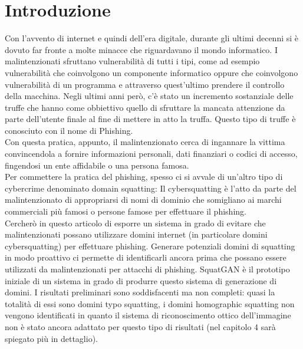 \chapter{Introduzione}

Con l'avvento di internet e quindi dell'era digitale, durante gli ultimi decenni si è dovuto far fronte a molte minacce che riguardavano il mondo informatico. I malintenzionati sfruttano vulnerabilità di tutti i tipi, come ad esempio vulnerabilità che coinvolgono un componente informatico oppure che coinvolgono vulnerabilità di un programma e attraverso quest'ultimo prendere il controllo della macchina.
Negli ultimi anni però, c'è stato un incremento sostanziale delle truffe che hanno come obbiettivo quello di sfruttare la mancata attenzione da parte dell'utente finale al fine di mettere in atto la truffa.
Questo tipo di truffe è conosciuto con il nome di Phishing.\\
Con questa pratica, appunto, il malintenzionato cerca di ingannare la vittima convincendola a fornire informazioni personali, dati finanziari o codici di accesso, fingendosi un ente affidabile o una persona famosa.\\
Per commettere la pratica del phishing, spesso ci si avvale di un'altro tipo di cybercrime denominato domain squatting: Il cybersquatting è l'atto da parte del malintenzionato di appropriarsi di nomi di dominio che somigliano ai marchi commerciali più famosi o persone famose per effettuare il phishing.\\
Cercherò in questo articolo di esporre un sistema in grado di evitare che malintenzionati possano utilizzare domini internet (in particolare domini cybersquatting) per effettuare phishing. Generare potenziali domini di squatting in modo proattivo ci permette di identificarli ancora prima che possano essere utilizzati da malintenzionati per attacchi di phishing. SquatGAN è il prototipo iniziale di un sistema in grado di produrre questo sistema di generazione di domini. I risultati preliminari sono soddisfacenti ma non completi: quasi la totalità di essi sono domini typo squatting, i domini homographic squatting non vengono identificati in quanto il sistema di riconoscimento ottico dell'immagine non è stato ancora adattato per questo tipo di risultati (nel capitolo 4 sarà spiegato più in dettaglio).

